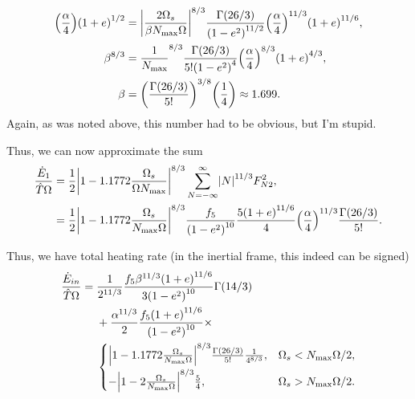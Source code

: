 \documentclass[11pt,
        usenames, %
        dvipsnames %
    ]{article}
\DeclarePairedDelimiter\abs{\lvert}{\rvert}
\DeclarePairedDelimiter\p{\lparen}{\rparen}
\begin{document}
\begin{itemize}
\begin{align}
                    \p*{\frac{\alpha}{4}}\p*{1 + e}^{1/2}
                &= \abs*{\frac{2\Omega_s}{\beta N_{\max}\Omega}}^{8/3}
                    \frac{\Gamma(26/3)}{\p*{1 - e^2}^{11/2}}
                    \p*{\frac{\alpha}{4}}^{11/3}\p*{1 + e}^{11/6},\\
            \beta^{8/3}
                &= \frac{1}{N_{\max}}^{8/3}
                    \frac{\Gamma(26/3)}{5! \p*{1 - e^2}^{4}}
                    \p*{\frac{\alpha}{4}}^{8/3}\p*{1 + e}^{4/3},\\
            \beta
                &= \p*{\frac{\Gamma(26/3)}{5!}}^{3/8} \p*{\frac{1}{4}}
                    \approx 1.699.
        \end{align}
        Again, as was noted above, this number had to be obvious, but I'm
        stupid.

        Thus, we can now approximate the sum
        \begin{align}
            \frac{\dot{E}_1}{\hat{T}\Omega}
                &= \frac{1}{2}
                    \abs*{1 - 1.1772\frac{\Omega_s}{\Omega N_{\max}}}^{8/3}
                    \sum\limits_{N = -\infty}^\infty \abs*{N}^{11/3}F_{N2}^2,\\
                &= \frac{1}{2}
                    \abs*{1 - 1.1772\frac{\Omega_s}{N_{\max}\Omega}}^{8/3}
                    \frac{f_5}{\p*{1 - e^2}^{10}}\frac{5\p*{1 + e}^{11/6}}{4}
                    \p*{\frac{\alpha}{4}}^{11/3}
                    \frac{\Gamma(26/3)}{5!}.
        \end{align}
\end{itemize}
Thus, we have total heating rate (in the inertial frame, this indeed can be
signed)
\begin{align}
    \frac{\dot{E}_{in}}{\hat{T}\Omega} ={}&
            \frac{1}{2^{11/3}}
            \frac{f_5 \beta^{11/3}\p*{1 + e}^{11/6}}{3\p*{1 - e^2}^{10}}
            \Gamma\p*{14/3}\nonumber\\
        & + \frac{\alpha^{11/3}}{2}
                \frac{f_5\p*{1 + e}^{11/6}}{\p*{1 - e^2}^{10}}
                \times\nonumber\\
        &\begin{cases}
            \abs*{1 - 1.1772\frac{\Omega_s}{N_{\max}\Omega}}^{8/3}
                \frac{\Gamma(26/3)}{5!}\frac{1}{4^{8/3}},
                & \Omega_s < N_{\max}\Omega/2,\\[5pt]
            -\abs*{1 - 2\frac{\Omega_s}{N_{\max}\Omega}}^{8/3}\frac{5}{4},
                & \Omega_s > N_{\max}\Omega/2.
        \end{cases}\label{eq:total_heating}
\end{align}
\end{document}
